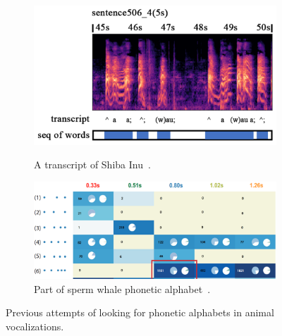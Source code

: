 \begin{figure}[th]
\begin{subfigure}[b]{0.3\linewidth}
		\label{fig:li}
	\end{subfigure}\quad
	\begin{subfigure}[b]{0.3\linewidth}
		\centering
		\includegraphics[width=0.95\linewidth]{images/huang.png}
		\caption{A transcript of Shiba Inu~\citep{huang2023transcribing}.}
		\label{fig:huang}
		\includegraphics[width=0.95\linewidth]{images/whale.png}
		\caption{Part of sperm whale phonetic alphabet~\citep{sharma2024contextual}.}
		\label{fig:whale}
	\end{subfigure}
\caption{Previous attempts of looking for phonetic alphabets in animal vocalizations.
}
\label{fig:phones}
\end{figure}


